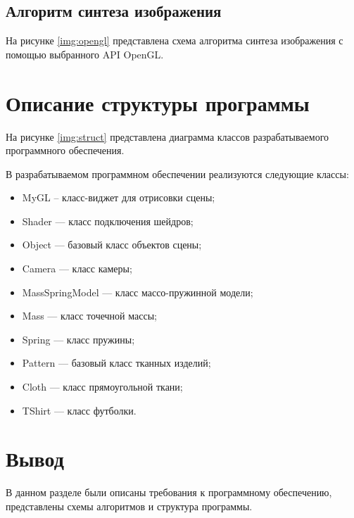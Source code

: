 
\clearpage
\subsection{Алгоритм синтеза изображения}

На рисунке \ref{img:opengl} представлена схема алгоритма синтеза
изображения с помощью выбранного API OpenGL.


\section{Описание структуры программы}

На рисунке \ref{img:struct} представлена диаграмма классов разрабатываемого
программного обеспечения.


В разрабатываемом программном обеспечении реализуются следующие классы:
\begin{itemize}
    \item MyGL -- класс-виджет для отрисовки сцены;
    \item Shader --- класс подключения шейдров;
    \item Object --- базовый класс объектов сцены;
    \item Camera --- класс камеры;
    \item MassSpringModel --- класс массо-пружинной модели;
    \item Mass --- класс точечной массы;
    \item Spring --- класс пружины;
    \item Pattern --- базовый класс тканных изделий;
    \item Cloth --- класс прямоугольной ткани;
    \item TShirt --- класс футболки.
\end{itemize}

\section*{Вывод}

В данном разделе были описаны требования к программному обеспечению,
представлены схемы алгоритмов и структура программы.

